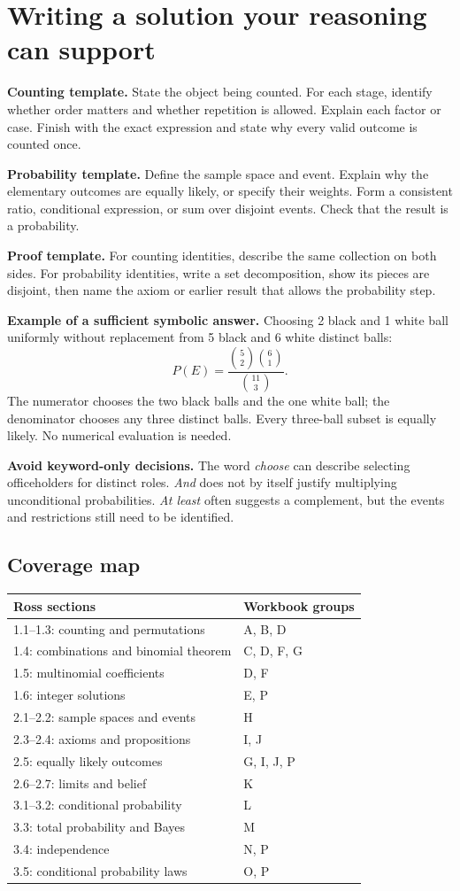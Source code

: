 \documentclass[11pt]{article}
\begin{document}
\section*{Writing a solution your reasoning can support}
\textbf{Counting template.} State the object being counted. For each stage, identify whether order matters and whether repetition is allowed. Explain each factor or case. Finish with the exact expression and state why every valid outcome is counted once.

\textbf{Probability template.} Define the sample space and event. Explain why the elementary outcomes are equally likely, or specify their weights. Form a consistent ratio, conditional expression, or sum over disjoint events. Check that the result is a probability.

\textbf{Proof template.} For counting identities, describe the same collection on both sides. For probability identities, write a set decomposition, show its pieces are disjoint, then name the axiom or earlier result that allows the probability step.

\textbf{Example of a sufficient symbolic answer.} Choosing 2 black and 1 white ball uniformly without replacement from 5 black and 6 white distinct balls:
\[P(E)=\frac{\binom52\binom61}{\binom{11}{3}}.\]
The numerator chooses the two black balls and the one white ball; the denominator chooses any three distinct balls. Every three-ball subset is equally likely. No numerical evaluation is needed.

\textbf{Avoid keyword-only decisions.} The word \emph{choose} can describe selecting officeholders for distinct roles. \emph{And} does not by itself justify multiplying unconditional probabilities. \emph{At least} often suggests a complement, but the events and restrictions still need to be identified.

\subsection*{Coverage map}
\begin{tabular}{p{2.8in}p{2.8in}}
\toprule
Ross sections & Workbook groups\\\midrule
1.1--1.3: counting and permutations & A, B, D\\
1.4: combinations and binomial theorem & C, D, F, G\\
1.5: multinomial coefficients & D, F\\
1.6: integer solutions & E, P\\
2.1--2.2: sample spaces and events & H\\
2.3--2.4: axioms and propositions & I, J\\
2.5: equally likely outcomes & G, I, J, P\\
2.6--2.7: limits and belief & K\\
3.1--3.2: conditional probability & L\\
3.3: total probability and Bayes & M\\
3.4: independence & N, P\\
3.5: conditional probability laws & O, P\\\bottomrule
\end{tabular}
\end{document}
